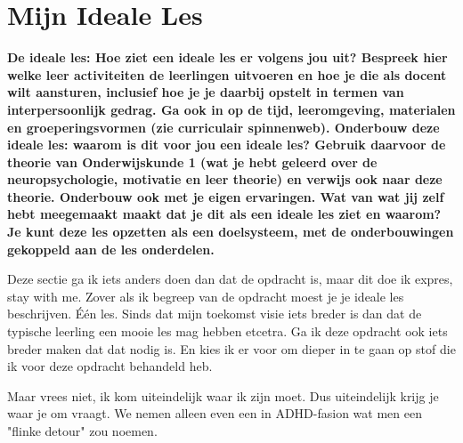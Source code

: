     \section{Mijn Ideale Les}
        \textbf{De ideale les: Hoe ziet een ideale les er volgens jou uit? Bespreek hier welke leer activiteiten de leerlingen uitvoeren en hoe je die als docent wilt aansturen, inclusief hoe je je daarbij opstelt in termen van interpersoonlijk gedrag. Ga ook in op de tijd, leeromgeving, materialen en groeperingsvormen (zie curriculair spinnenweb). Onderbouw deze ideale les: waarom is dit voor jou een ideale les? Gebruik daarvoor de theorie van Onderwijskunde 1 (wat je hebt geleerd over de neuropsychologie, motivatie en leer theorie) en verwijs ook naar deze theorie. Onderbouw ook met je eigen ervaringen. Wat van wat jij zelf hebt meegemaakt maakt dat je dit als een ideale les ziet en waarom? Je kunt deze les opzetten als een doelsysteem, met de onderbouwingen gekoppeld aan de les onderdelen.}
    
        \bigskip
        
        \noindent Deze sectie ga ik iets anders doen dan dat de opdracht is, maar dit doe ik expres, stay with me. Zover als ik begreep van de opdracht moest je je ideale les beschrijven. Één les. Sinds dat mijn toekomst visie iets breder is dan dat de typische leerling een mooie les mag hebben etcetra. Ga ik deze opdracht ook iets breder maken dat dat nodig is. En kies ik er voor om dieper in te gaan op stof die ik voor deze opdracht behandeld heb. 

        \bigskip
        
        \noindent Maar vrees niet, ik kom uiteindelijk waar ik zijn moet. Dus uiteindelijk krijg je waar je om vraagt. We nemen alleen even een in ADHD-fasion wat men een "flinke detour" zou noemen.